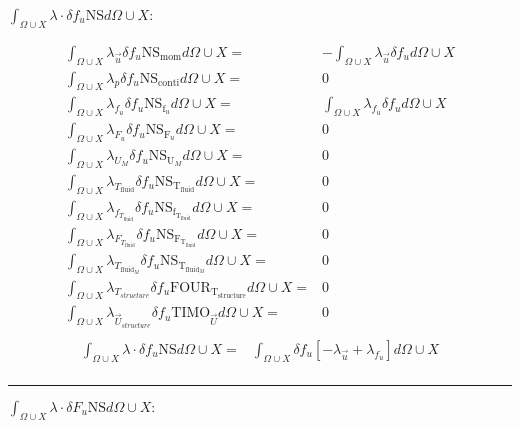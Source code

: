 \documentclass[10pt]{article} %
\begin{document}
\begin{center}
\begin{flushleft}
	$\int_{\Omega \cup X} \lambda \cdot \delta f_u \text{NS}d\Omega \cup X :$
\end{flushleft}
\begin{align*}
	\int_{\Omega \cup X} \lambda_{\vec{u}} \delta f_u \text{NS}_{\text{mom}} d\Omega \cup X =& -\int_{\Omega \cup X} \lambda_{\vec{u}} \delta f_u d\Omega \cup X\\
	\int_{\Omega \cup X} \lambda_p \delta f_u \text{NS}_{\text{conti}} d\Omega \cup X  =& 0\\
	\int_{\Omega \cup X} \lambda_{f_u} \delta f_u \text{NS}_{\text{f}_u} d\Omega \cup X =& \int_{\Omega \cup X} \lambda_{f_u} \delta f_u d\Omega \cup X\\
	\int_{\Omega \cup X} \lambda_{F_u} \delta f_u \text{NS}_{\text{F}_u} d\Omega \cup X =& 0\\
	\int_{\Omega \cup X} \lambda_{U_M} \delta f_u \text{NS}_{\text{U}_M} d\Omega \cup X =& 0\\
	\int_{\Omega \cup X} \lambda_{T_{\text{fluid}}} \delta f_u \text{NS}_{\text{T}_{\text{fluid}}} d\Omega \cup X =& 0\\
	\int_{\Omega \cup X} \lambda_{f_{T_{\text{fluid}}}} \delta f_u \text{NS}_{\text{f}_{\text{T}_{\text{fluid}}}} d\Omega \cup X =& 0\\
	\int_{\Omega \cup X} \lambda_{F_{T_{\text{fluid}}}} \delta f_u \text{NS}_{\text{F}_{\text{T}_{\text{fluid}}}} d\Omega \cup X =& 0\\
	\int_{\Omega \cup X} \lambda_{T_{\text{fluid}_M}} \delta f_u \text{NS}_{\text{T}_{\text{fluid}_M}} d\Omega \cup X =& 0\\
	\int_{\Omega \cup X} \lambda_{T_{structure}} \delta f_u \text{FOUR}_{\text{T}_{\text{structure}}} d\Omega \cup X =& 0\\
	\int_{\Omega \cup X} \lambda_{\vec{U}_{structure}} \delta f_u \text{TIMO}_{\vec{U}} d\Omega \cup X =& 0\\
\end{align*}
\begin{align*}
	\int_{\Omega \cup X} \lambda \cdot \delta f_u \text{NS}d\Omega \cup X 
	=&\int_{\Omega \cup X} \delta f_u \left[ -\lambda_{\vec{u}} + \lambda_{f_u} \right] d\Omega \cup X\\
\end{align*}
\noindent\rule[1ex]{\textwidth}{1pt}
\newpage
\begin{flushleft}
	$\int_{\Omega \cup X} \lambda \cdot \delta F_u \text{NS}d\Omega \cup X :$
\end{flushleft}

\end{center}
\end{document}
